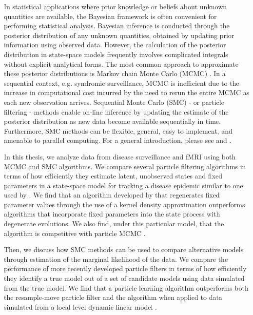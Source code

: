 In statistical applications where prior knowledge or beliefs about unknown quantities are available, the Bayesian framework is often convenient for performing statistical analysis.  Bayesian inference is conducted through the posterior distribution of any unknown quantities, obtained by updating prior information using observed data. However, the calculation of the posterior distribution in state-space models frequently involves complicated integrals without explicit analytical forms. The most common approach to approximate these posterior distributions is Markov chain Monte Carlo (MCMC) \citep{Gelf:Smit:samp:1990}. In a sequential context, e.g. syndromic surveillance, MCMC is inefficient due to the increase in computational cost incurred by the need to rerun the entire MCMC as each new observation arrives. Sequential Monte Carlo (SMC) - or particle filtering - methods enable on-line inference by updating the estimate of the posterior distribution as new data become available sequentially in time. Furthermore, SMC methods can be flexible, general, easy to implement, and amenable to parallel computing. For a general introduction, please see \cite{Douc:deFr:Gord:sequ:2001} and \cite{cappe2007overview}.

In this thesis, we analyze data from disease surveillance and fMRI using both MCMC and SMC algorithms. We compare several particle filtering algorithms in terms of how efficiently they estimate latent, unobserved states and fixed parameters in a state-space model for tracking a disease epidemic similar to one used by \citet{skvortsov2012monitoring}. We find that an algorithm developed by \citet{Liu:West:comb:2001} that regenerates fixed parameter values through the use of a kernel density approximation outperforms algorithms that incorporate fixed parameters into the state process with degenerate evolutions. We also find, under this particular model, that the \citet{Liu:West:comb:2001} algorithm is competitive with particle MCMC \citep{Andr:Douc:Hol:pmcmc:2010}.

Then, we discuss how SMC methods can be used to compare alternative models through estimation of the marginal likelihood of the data. We compare the performance of more recently developed particle filters in terms of how efficiently they identify a true model out of a set of candidate models using data simulated from the true model. We find that a particle learning algorithm \citep{Carv:Joha:Lope:Pols:part} outperforms both the resample-move particle filter \citep{Gilk:Berz:foll:2001} and the \citet{Liu:West:comb:2001} algorithm when applied to data simulated from a local level dynamic linear model \cite[Chapter 4.3.1][]{petris:camp:2009:dynamic}.

